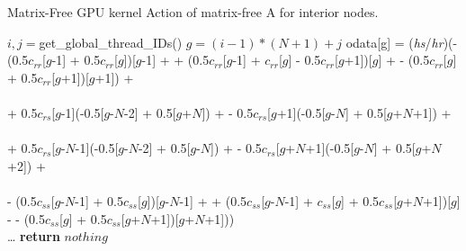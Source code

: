 \setcounter{algorithm}{1}
\begin{algorithm*}
\caption{Matrix-Free GPU kernel Action of matrix-free A for interior nodes.}\label{alg:mfA-1}
\algrenewcommand{}
\begin{algorithmic}
    \State  $i, j = $get\_global\_thread\_IDs()
    \State $g = (i-1) * (N+1) + j$
     
        \State odata[g] = (\emph{hs}/\emph{hr})(- (0.5$c_{rr}$[$g$-1] + 0.5$c_{rr}$[$g$])[$g$-1] +
        \State \hspace{25mm}    + (0.5$c_{rr}$[$g$-1]  +  $c_{rr}$[$g$] - 0.5$c_{rr}$[$g$+1])[$g$] + 
        \State  \hspace{25mm}     - (0.5$c_{rr}$[$g$] + 0.5$c_{rr}$[$g$+1])[$g$+1]) + \\ \\
        \State \hspace{25mm} + 0.5$c_{rs}$[$g$-1](-0.5[$g$-$N$-2] + 0.5[$g$+$N$]) + 
        \State   \hspace{25mm} - 0.5$c_{rs}$[$g$+1](-0.5[$g$-$N$] + 0.5[$g$+$N$+1]) + \\ \\
        \State  \hspace{25mm} + 0.5$c_{rs}$[$g$-$N$-1](-0.5[$g$-$N$-2] + 0.5[$g$-$N$]) + 
        \State  \hspace{25mm} - 0.5$c_{rs}$[$g$+$N$+1](-0.5[$g$-$N$] + 0.5[$g$+$N$+2]) + \\ \\
        \State  \hspace{25mm} - (0.5$c_{ss}$[$g$-$N$-1] + 0.5$c_{ss}$[$g$])[$g$-$N$-1] + 
        \State  \hspace{25mm} + (0.5$c_{ss}$[$g$-$N$-1]  + $c_{ss}$[$g$] + 0.5$c_{ss}$[$g$+$N$+1])[$g$] - 
        \State  \hspace{25mm}     - (0.5$c_{ss}$[$g$] + 0.5$c_{ss}$[$g$+$N$+1])[$g$+$N$+1])) \\
    \EndIf
    \State  \dots {}
    \State \textbf{return} $nothing $ 
\EndProcedure
\end{algorithmic}
\end{algorithm*}


